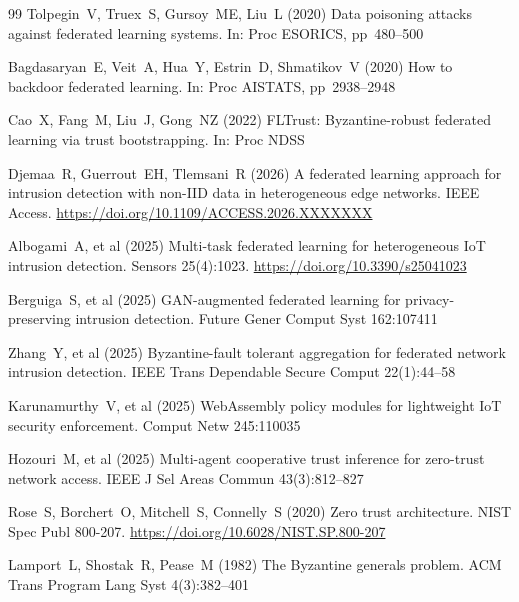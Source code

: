 \documentclass[11pt,a4paper,twocolumn]{article}
\theoremstyle{definition}
\begin{document}
\begin{thebibliography}{99}
Tolpegin~V, Truex~S, Gursoy~ME, Liu~L (2020)
Data poisoning attacks against federated learning systems.
In: Proc ESORICS, pp~480--500

Bagdasaryan~E, Veit~A, Hua~Y, Estrin~D, Shmatikov~V (2020)
How to backdoor federated learning.
In: Proc AISTATS, pp~2938--2948

Cao~X, Fang~M, Liu~J, Gong~NZ (2022)
FLTrust: Byzantine-robust federated learning via trust bootstrapping.
In: Proc NDSS

Djemaa~R, Guerrout~EH, Tlemsani~R (2026)
A federated learning approach for intrusion detection with non-IID data
in heterogeneous edge networks.
IEEE Access.
\url{https://doi.org/10.1109/ACCESS.2026.XXXXXXX}

Albogami~A, et al (2025)
Multi-task federated learning for heterogeneous IoT intrusion detection.
Sensors 25(4):1023.
\url{https://doi.org/10.3390/s25041023}

Berguiga~S, et al (2025)
GAN-augmented federated learning for privacy-preserving intrusion detection.
Future Gener Comput Syst 162:107411

Zhang~Y, et al (2025)
Byzantine-fault tolerant aggregation for federated network intrusion
detection.
IEEE Trans Dependable Secure Comput 22(1):44--58

Karunamurthy~V, et al (2025)
WebAssembly policy modules for lightweight IoT security enforcement.
Comput Netw 245:110035

Hozouri~M, et al (2025)
Multi-agent cooperative trust inference for zero-trust network access.
IEEE J Sel Areas Commun 43(3):812--827

Rose~S, Borchert~O, Mitchell~S, Connelly~S (2020)
Zero trust architecture.
NIST Spec Publ 800-207.
\url{https://doi.org/10.6028/NIST.SP.800-207}

Lamport~L, Shostak~R, Pease~M (1982)
The Byzantine generals problem.
ACM Trans Program Lang Syst 4(3):382--401

\end{thebibliography}
\end{document}
